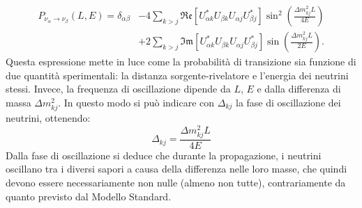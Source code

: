 \begin{equation}
    \begin{aligned} P_{\nu_\alpha \rightarrow \nu_\beta}(L, E)=\delta_{\alpha \beta} & -4 \sum_{k>j} \Re \mathfrak{e}\left[U_{\alpha k}^* U_{\beta k} U_{\alpha j} U_{\beta j}^*\right] \sin ^2\left(\frac{\Delta m_{k j}^2 L}{4 E}\right) \\ & +2 \sum_{k>j} \Im \mathfrak{m}\left[U_{\alpha k}^* U_{\beta k} U_{\alpha j} U_{\beta j}^*\right] \sin \left(\frac{\Delta m_{k j}^2 L}{2 E}\right) .\end{aligned}
    \label{eq:tra}
\end{equation}
Questa espressione mette in luce come la probabilità di transizione sia funzione di due quantità sperimentali: la distanza sorgente-rivelatore e l'energia dei neutrini stessi. Invece, la frequenza di oscillazione dipende da $L$, $E$ e dalla differenza di massa $\Delta m_{kj}^2$. In questo modo si può indicare con $\Delta_{kj}$ la fase di oscillazione dei neutrini, ottenendo:
\begin{equation}
    \Delta_{kj}=\frac{\Delta m_{kj}^2L}{4E}
    \label{eq:osc}
\end{equation}
 Dalla fase di oscillazione si deduce che durante la propagazione, i neutrini oscillano tra i diversi sapori a causa della differenza nelle loro masse, che quindi devono essere necessariamente non nulle (almeno non tutte), contrariamente da quanto previsto dal Modello Standard.
 

